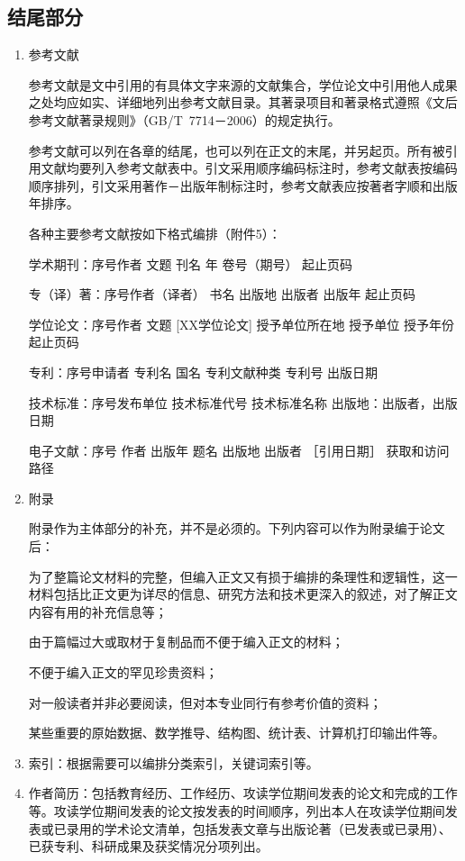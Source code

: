 \documentclass[twoside,longtitle]{LZUthesis}
\begin{document}
\subsection{结尾部分}
\begin{enumerate}
\item 参考文献


参考文献是文中引用的有具体文字来源的文献集合，学位论文中引用他人成果之处均应如实、详细地列出参考文献目录。其著录项目和著录格式遵照《文后参考文献著录规则》（GB/T~7714－2006）的规定执行。


参考文献可以列在各章的结尾，也可以列在正文的末尾，并另起页。所有被引用文献均要列入参考文献表中。引文采用顺序编码标注时，参考文献表按编码顺序排列，引文采用著作－出版年制标注时，参考文献表应按著者字顺和出版年排序。


各种主要参考文献按如下格式编排（附件5）：


学术期刊：序号作者 文题 刊名 年 卷号（期号） 起止页码


专（译）著：序号作者（译者） 书名 出版地 出版者 出版年 起止页码


学位论文：序号作者 文题 {[}XX学位论文{]} 授予单位所在地 授予单位 授予年份 起止页码


专利：序号申请者 专利名 国名 专利文献种类 专利号 出版日期


技术标准：序号发布单位 技术标准代号 技术标准名称 出版地：出版者，出版日期


电子文献：序号 作者 出版年 题名 出版地 出版者 ［引用日期］ 获取和访问路径

\item 附录


附录作为主体部分的补充，并不是必须的。下列内容可以作为附录编于论文后：


为了整篇论文材料的完整，但编入正文又有损于编排的条理性和逻辑性，这一材料包括比正文更为详尽的信息、研究方法和技术更深入的叙述，对了解正文内容有用的补充信息等；


由于篇幅过大或取材于复制品而不便于编入正文的材料；


不便于编入正文的罕见珍贵资料；


对一般读者并非必要阅读，但对本专业同行有参考价值的资料；


某些重要的原始数据、数学推导、结构图、统计表、计算机打印输出件等。

\item 索引：根据需要可以编排分类索引，关键词索引等。
\item 作者简历：包括教育经历、工作经历、攻读学位期间发表的论文和完成的工作等。攻读学位期间发表的论文按发表的时间顺序，列出本人在攻读学位期间发表或已录用的学术论文清单，包括发表文章与出版论著（已发表或已录用）、已获专利、科研成果及获奖情况分项列出。



\end{enumerate}
\end{document}
